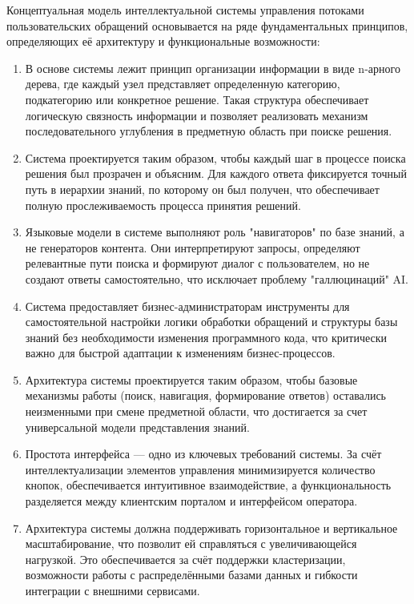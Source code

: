 Концептуальная модель интеллектуальной системы управления потоками пользовательских обращений основывается на ряде фундаментальных принципов, определяющих её архитектуру и функциональные возможности:
\begin{enumerate}[label=\arabic*.]
    \item В основе системы лежит принцип организации информации в виде n-арного дерева, где каждый узел представляет определенную категорию, подкатегорию или конкретное решение. Такая структура обеспечивает логическую связность информации и позволяет реализовать механизм последовательного углубления в предметную область при поиске решения.
    \item Система проектируется таким образом, чтобы каждый шаг в процессе поиска решения был прозрачен и объясним. Для каждого ответа фиксируется точный путь в иерархии знаний, по которому он был получен, что обеспечивает полную прослеживаемость процесса принятия решений.
    \item Языковые модели в системе выполняют роль "навигаторов" по базе знаний, а не генераторов контента. Они интерпретируют запросы, определяют релевантные пути поиска и формируют диалог с пользователем, но не создают ответы самостоятельно, что исключает проблему "галлюцинаций" AI.
    \item Система предоставляет бизнес-администраторам инструменты для самостоятельной настройки логики обработки обращений и структуры базы знаний без необходимости изменения программного кода, что критически важно для быстрой адаптации к изменениям бизнес-процессов.
    \item Архитектура системы проектируется таким образом, чтобы базовые механизмы работы (поиск, навигация, формирование ответов) оставались неизменными при смене предметной области, что достигается за счет универсальной модели представления знаний.
    \item Простота интерфейса — одно из ключевых требований системы. За счёт интеллектуализации элементов управления минимизируется количество кнопок, обеспечивается интуитивное взаимодействие, а функциональность разделяется между клиентским порталом и интерфейсом оператора.
    \item Архитектура системы должна поддерживать горизонтальное и вертикальное масштабирование, что позволит ей справляться с увеличивающейся нагрузкой. Это обеспечивается за счёт поддержки кластеризации, возможности работы с распределёнными базами данных и гибкости интеграции с внешними сервисами.
\end{enumerate}

